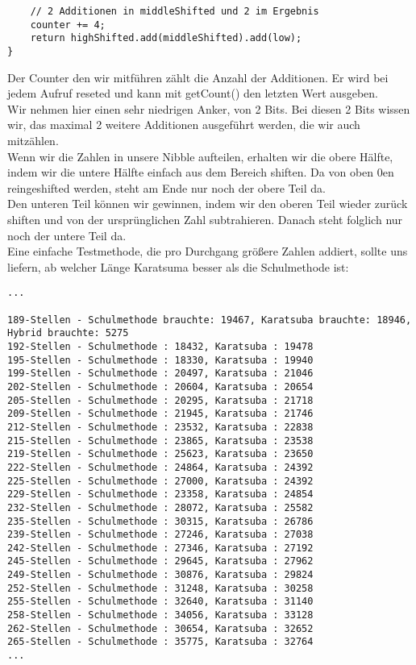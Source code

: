 \documentclass[11pt,a4paper,ngerman]{article}
\begin{document}
\begin{enumerate}[\bfseries (a)]
\begin{lstlisting}
	// 2 Additionen in middleShifted und 2 im Ergebnis
	counter += 4;
	return highShifted.add(middleShifted).add(low);
}
\end{lstlisting}
Der Counter den wir mitführen zählt die Anzahl der Additionen. Er wird bei jedem Aufruf reseted und kann mit getCount() den letzten Wert ausgeben.\\
Wir nehmen hier einen sehr niedrigen Anker, von 2 Bits. Bei diesen 2 Bits wissen wir, das maximal 2 weitere Additionen ausgeführt werden, die wir auch mitzählen.\\
Wenn wir die Zahlen in unsere Nibble aufteilen, erhalten wir die obere Hälfte, indem wir die untere Hälfte einfach aus dem Bereich shiften. Da von oben 0en reingeshifted werden, steht am Ende nur noch der obere Teil da.\\
Den unteren Teil können wir gewinnen, indem wir den oberen Teil wieder zurück shiften und von der ursprünglichen Zahl subtrahieren. Danach steht folglich nur noch der untere Teil da.\\

Eine einfache Testmethode, die pro Durchgang größere Zahlen addiert, sollte uns liefern, ab welcher Länge Karatsuma besser als die Schulmethode ist:

\begin{lstlisting}
...

189-Stellen - Schulmethode brauchte: 19467, Karatsuba brauchte: 18946, Hybrid brauchte: 5275
192-Stellen - Schulmethode : 18432, Karatsuba : 19478
195-Stellen - Schulmethode : 18330, Karatsuba : 19940
199-Stellen - Schulmethode : 20497, Karatsuba : 21046
202-Stellen - Schulmethode : 20604, Karatsuba : 20654
205-Stellen - Schulmethode : 20295, Karatsuba : 21718
209-Stellen - Schulmethode : 21945, Karatsuba : 21746
212-Stellen - Schulmethode : 23532, Karatsuba : 22838
215-Stellen - Schulmethode : 23865, Karatsuba : 23538
219-Stellen - Schulmethode : 25623, Karatsuba : 23650
222-Stellen - Schulmethode : 24864, Karatsuba : 24392
225-Stellen - Schulmethode : 27000, Karatsuba : 24392
229-Stellen - Schulmethode : 23358, Karatsuba : 24854
232-Stellen - Schulmethode : 28072, Karatsuba : 25582
235-Stellen - Schulmethode : 30315, Karatsuba : 26786
239-Stellen - Schulmethode : 27246, Karatsuba : 27038
242-Stellen - Schulmethode : 27346, Karatsuba : 27192
245-Stellen - Schulmethode : 29645, Karatsuba : 27962
249-Stellen - Schulmethode : 30876, Karatsuba : 29824
252-Stellen - Schulmethode : 31248, Karatsuba : 30258
255-Stellen - Schulmethode : 32640, Karatsuba : 31140
258-Stellen - Schulmethode : 34056, Karatsuba : 33128
262-Stellen - Schulmethode : 30654, Karatsuba : 32652
265-Stellen - Schulmethode : 35775, Karatsuba : 32764
...
\end{lstlisting}


\end{enumerate}
\end{document}
